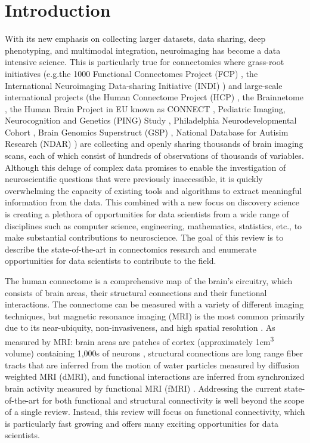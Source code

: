 \section{Introduction}

With its new emphasis on collecting larger datasets, data sharing, deep phenotyping, and multimodal integration, neuroimaging has become a data intensive science. This is particularly true for connectomics where grass-root initiatives (e.g.the 1000 Functional Connectomes Project (FCP) \cite{Biswal2010}, the International Neuroimaging Data-sharing Initiative (INDI) \cite{Mennes2013}) and large-scale international projects (the Human Connectome Project (HCP) \cite{RosenHCP2010,VanEssen2012}, the Brainnetome \cite{Jiang2013}, the Human Brain Project in EU known as CONNECT \cite{Assaf2013}, Pediatric Imaging, Neurocognition and Genetics (PING) Study \cite{JerniganPING}, Philadelphia Neurodevelopmental Cohort \cite{Satterthwaite2014},  Brain Genomics Superstruct (GSP) \cite{BucknerGSP2014}, National Database for Autisim Research (NDAR) \cite{NDAR}) are collecting and openly sharing thousands of brain imaging scans, each of which consist of hundreds of observations of thousands of variables. Although this deluge of complex data promises to enable the investigation of neuroscientific questions that were previously inaccessible, it is quickly overwhelming the capacity of existing tools and algorithms to extract meaningful information from the data. This combined with a new focus on discovery science is creating a plethora of opportunities for data scientists from a wide range of disciplines such as computer science, engineering, mathematics, statistics, etc., to make substantial contributions to neuroscience. The goal of this review is to describe the state-of-the-art in connectomics research and enumerate opportunities for data scientists to contribute to the field.

The human connectome is a comprehensive map of the brain's circuitry, which consists of brain areas, their structural connections and their functional interactions. The connectome can be measured with a variety of different imaging techniques, but magnetic resonance imaging (MRI) is the most common primarily due to its near-ubiquity, non-invasiveness, and high spatial resolution \cite{Craddock2013}. As measured by MRI: brain areas are patches of cortex (approximately 1\si{\centi\meter\cubed} volume) containing 1,000s of neurons \cite{Varela2001}, structural connections are long range fiber tracts that are inferred from the motion of water particles measured by diffusion weighted MRI (dMRI), and functional interactions are inferred from synchronized brain activity measured by functional MRI (fMRI) \cite{Behrens2012}. Addressing the current state-of-the-art for both functional and structural connectivity is well beyond the scope of a single review. Instead, this review will focus on functional connectivity, which is particularly fast growing and offers many exciting opportunities for data scientists.

